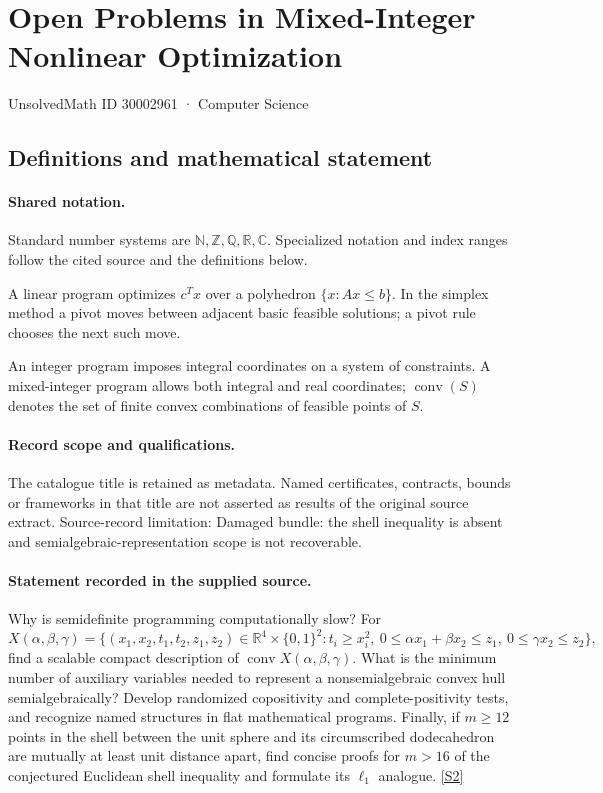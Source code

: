 \documentclass[11pt]{article}
\newcommand{\sref}[2]{\hyperlink{source:#1:#2}{[S#2]}}
\begin{document}
\setcounter{section}{30002960}
\section{Open Problems in Mixed-Integer Nonlinear Optimization}\label{30002961}
{\small\sffamily UnsolvedMath ID 30002961 · Computer Science}
\subsection{Definitions and mathematical statement}

\paragraph{Shared notation.}Standard number systems are $\mathbb N,\mathbb Z,\mathbb Q,\mathbb R,\mathbb C$. Specialized notation and index ranges follow the cited source and the definitions below.


A linear program optimizes $c^Tx$ over a polyhedron $\{x:Ax\leq b\}$. In the simplex method a pivot moves between adjacent basic feasible solutions; a pivot rule chooses the next such move.

An integer program imposes integral coordinates on a system of constraints. A mixed-integer program allows both integral and real coordinates; $\operatorname{conv}(S)$ denotes the set of finite convex combinations of feasible points of $S$.
\paragraph{Record scope and qualifications.}
The catalogue title is retained as metadata. Named certificates, contracts, bounds or frameworks in that title are not asserted as results of the original source extract.
Source-record limitation: Damaged bundle: the shell inequality is absent and semialgebraic-representation scope is not recoverable.
\paragraph{Statement recorded in the supplied source.}
Why is semidefinite programming computationally slow? For
$$X(\alpha,\beta,\gamma)=\{(x_1,x_2,t_1,t_2,z_1,z_2)\in\mathbb R^4\times\{0,1\}^2:t_i\geq x_i^2,\ 0\leq\alpha x_1+\beta x_2\leq z_1,\ 0\leq\gamma x_2\leq z_2\},$$
find a scalable compact description of $\operatorname{conv}X(\alpha,\beta,\gamma)$. What is the minimum number of auxiliary variables needed to represent a nonsemialgebraic convex hull semialgebraically? Develop randomized copositivity and complete-positivity tests, and recognize named structures in flat mathematical programs. Finally, if $m\geq12$ points in the shell between the unit sphere and its circumscribed dodecahedron are mutually at least unit distance apart, find concise proofs for $m>16$ of the conjectured Euclidean shell inequality and formulate its $\ell_1$ analogue. \sref{30002961}{2}
\end{document}
